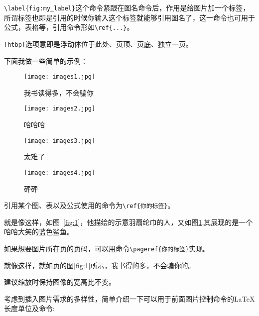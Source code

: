 \verb|\label{fig:my_label}|这个命令紧跟在图名命令后，作用是给图片加一个标签，所谓标签也即是引用的时候你输入这个标签就能够引用图名了，这一命令也可用于公式，表格等，引用命令形如\verb|\ref{...}|。

\verb|[htbp]|选项意即是浮动体位于此处、页顶、页底、独立一页。

下面我做一些简单的示例：

\begin{figure}[!htb]
  \begin{minipage}[t]{0.5\linewidth}
    \centering
     \texttt{[image: images1.jpg]}
     \caption{我书读得多，不会骗你}\label{fig:1}
  \end{minipage}%
  \begin{minipage}[t]{0.5\linewidth}
    \centering
    \texttt{[image: images2.jpg]}
    \caption{哈哈哈}\label{fig:2}
  \end{minipage}
\end{figure}

\begin{figure}[!htb]
    \begin{minipage}[t]{0.5\linewidth}
    \centering
     \texttt{[image: images3.jpg]}
     \caption{太难了}\label{fig:3}
  \end{minipage}%
  \begin{minipage}[t]{0.5\linewidth}
    \centering
    \texttt{[image: images4.jpg]}
    \caption{砰砰}\label{fig:4}
  \end{minipage}
\end{figure}

引用某个图、表以及公式使用的命令为\verb|\ref{你的标签}|。\par 
就是像这样，如图~\ref{fig:1}，他描绘的示意羽扇纶巾的人，又如图\ref{fig:2},其展现的是一个哈哈大笑的蓝色鲨鱼。\par 
如果想要图片所在页的页码，可以用命令\verb|\pageref{你的标签}|实现。\par 
就像这样，就如\pageref{fig:1}页的图\ref{fig:1}所示，我书得的多，不会骗你的。\par 
建议缩放时保持图像的宽高比不变。

考虑到插入图片需求的多样性，简单介绍一下可以用于前面图片控制命令的\LaTeX 长度单位及命令:

